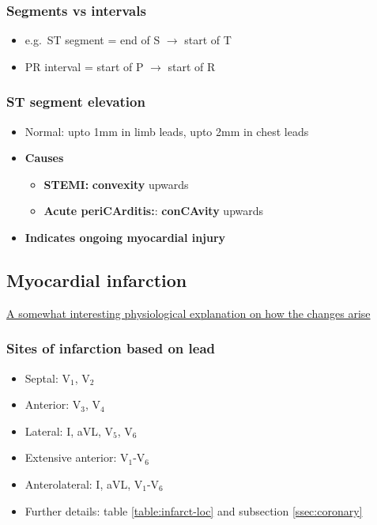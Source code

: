 \documentclass[
  12pt,
]{memoir}
\providecommand{\tightlist}{%
  \setlength{\itemsep}{0pt}\setlength{\parskip}{0pt}}
\begin{document}
\hypertarget{segments-vs-intervals}{%
\subsubsection{Segments vs intervals}\label{segments-vs-intervals}}

\begin{itemize}
\tightlist
\item
  e.g.~ST segment = end of S \(\rightarrow\) start of T
\item
  PR interval = start of P \(\rightarrow\) start of R
\end{itemize}

\hypertarget{st-segment-elevation}{%
\subsubsection{ST segment elevation}\label{st-segment-elevation}}

\begin{itemize}
\tightlist
\item
  Normal: upto 1mm in limb leads, upto 2mm in chest leads
\item
  \textbf{Causes}

  \begin{itemize}
  \tightlist
  \item
    \textbf{STEMI:} \textbf{convexity} upwards
  \item
    \textbf{Acute periCArditis:}: \textbf{conCAvity} upwards
  \end{itemize}
\item
  \textbf{Indicates ongoing myocardial injury}
\end{itemize}

\hypertarget{myocardial-infarction}{%
\subsection{Myocardial infarction}\label{myocardial-infarction}}

\href{https://www.cvphysiology.com/CAD/CAD012}{A somewhat interesting
physiological explanation on how the changes arise}

\hypertarget{sites-of-infarction-based-on-lead}{%
\subsubsection{Sites of infarction based on
lead}\label{sites-of-infarction-based-on-lead}}

\begin{itemize}
\tightlist
\item
  Septal: V\(_1\), V\(_2\)
\item
  Anterior: V\(_3\), V\(_4\)
\item
  Lateral: I, aVL, V\(_5\), V\(_6\)
\item
  Extensive anterior: V\(_1\)-V\(_6\)
\item
  Anterolateral: I, aVL, V\(_1\)-V\(_6\)
\item
  Further details: table \ref{table:infarct-loc} and subsection
  \ref{ssec:coronary}
\end{itemize}
\end{document}
